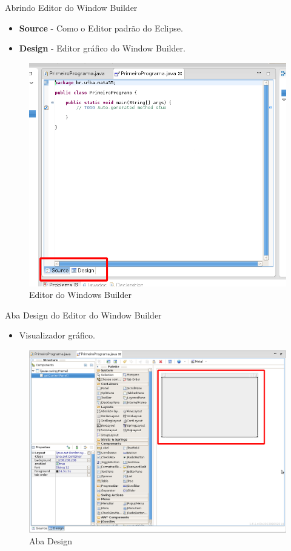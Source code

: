 \documentclass[10pt]{beamer}
\begin{document}
\begin{frame}{Abrindo Editor do Window Builder}
\begin{itemize}
\item \textbf{Source} - Como o Editor padrão do Eclipse.
\item \textbf{Design} - Editor gráfico do Window Builder.
\end{itemize}
  \begin{figure}[!htb]
    \centering
    \includegraphics[scale=.3]{windows_builder_perspective_source}
    \caption{Editor do Windows Builder}
    \label{figRotulo}
  \end{figure}
\end{frame}{}

\begin{frame}{Aba Design do Editor do Window Builder}
\begin{itemize}
\item Visualizador gráfico.
\end{itemize}
  \begin{figure}[!htb]
    \centering
    \includegraphics[scale=.25]{windows_builder_perspective_part1}
    \caption{Aba Design}
    \label{figRotulo}
  \end{figure}
\end{frame}{}
\end{document}
